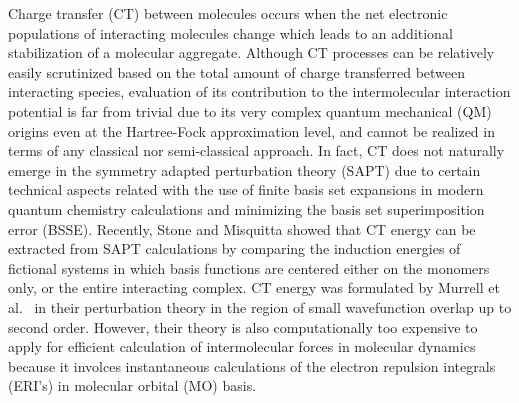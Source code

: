 Charge transfer (CT) between molecules occurs when the net electronic populations 
of interacting molecules change which leads to an additional stabilization 
of a molecular aggregate.\cite{Otto.Ladik.IJQC.1980,Stone.TheTheoryOfIntermolecularForces.1996}
Although CT processes can be relatively easily scrutinized based
on the total amount of charge transferred between interacting species,\cite{Otto.Ladik.IJQC.1980}
evaluation of its contribution to the intermolecular interaction
potential\cite{Stone.TheTheoryOfIntermolecularForces.1996} is far from trivial due to 
its very complex quantum mechanical (QM) origins even at the Hartree\hyp{}Fock approximation level,\cite{Otto.Ladik.ChemPhys.1975}
and cannot be realized in terms of any classical nor semi\hyp{}classical approach.
In fact, CT does not naturally emerge in the symmetry 
adapted perturbation theory\cite{Jeziorski.Moszynski.Szalewicz.ChemRev.1994} (SAPT)
due to certain technical aspects related with the use of finite basis set expansions
in modern quantum chemistry calculations and minimizing the basis set superimposition error (BSSE). 
Recently, Stone and Misquitta showed that CT energy
can be extracted from SAPT calculations by comparing the induction energies
of fictional systems in which basis functions are centered either on the monomers only, or the entire 
interacting complex.\cite{Stone.Misquitta.CPL.2009}
CT energy was formulated by Murrell et al.~\cite{Murrell.Randic.Williams.Longuet-Higgins.ProcRSocLondA.1965} 
in their perturbation theory in the region of small wavefunction overlap up to second order.
However, their theory is also computationally too expensive to apply for efficient
calculation of intermolecular forces in molecular dynamics because
it involces instantaneous calculations of the electron repulsion integrals (ERI's)
in molecular orbital (MO) basis.\cite{Otto.Ladik.ChemPhys.1975}

